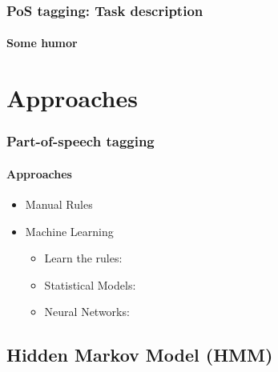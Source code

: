 \documentclass[xcolor=table]{beamer}
\begin{document}
\begin{frame}
\frametitle{PoS tagging: Task description}
\framesubtitle{Some humor}

\begin{center}
\end{center}

\end{frame}

\section{Approaches}

\begin{frame}
\frametitle{Part-of-speech tagging}
\framesubtitle{Approaches}

\begin{itemize}
	\item Manual Rules
	\item Machine Learning
	\begin{itemize}
		\item Learn the rules: 
		\item Statistical Models: 
		\item Neural Networks: 
	\end{itemize}
\end{itemize}

\end{frame}

\subsection{Hidden Markov Model (HMM)}
\end{document}
